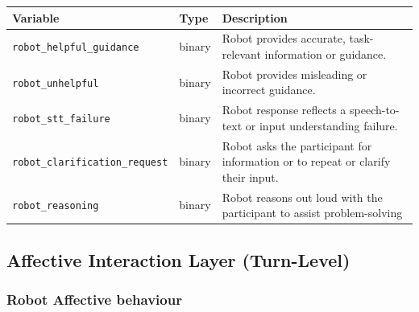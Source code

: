 \documentclass[
  authoryear,
  doubleblind,
  3p]{elsarticle}
\newcounter{none} %
\begin{document}
{\def\LTcaptype{none} %
\begin{longtable}[]{@{}
  >{\raggedright\arraybackslash}p{}
  >{\raggedright\arraybackslash}p{}
  >{\raggedright\arraybackslash}p{}@{}}
\toprule\noalign{}
\begin{minipage}[b]{\linewidth}\raggedright
Variable
\end{minipage} & \begin{minipage}[b]{\linewidth}\raggedright
Type
\end{minipage} & \begin{minipage}[b]{\linewidth}\raggedright
Description
\end{minipage} \\
\midrule\noalign{}
\endhead
\bottomrule\noalign{}
\endlastfoot
\texttt{robot\_helpful\_guidance} & binary & Robot provides accurate,
task-relevant information or guidance. \\
\texttt{robot\_unhelpful} & binary & Robot provides misleading or
incorrect guidance. \\
\texttt{robot\_stt\_failure} & binary & Robot response reflects a
speech-to-text or input understanding failure. \\
\texttt{robot\_clarification\_request} & binary & Robot asks the
participant for information or to repeat or clarify their input. \\
\texttt{robot\_reasoning} & binary & Robot reasons out loud with the
participant to assist problem-solving \\
\end{longtable}
}

\subsection{Affective Interaction Layer
(Turn-Level)}\label{affective-interaction-layer-turn-level}

\subsubsection*{Robot Affective
behaviour}\label{robot-affective-behaviour}
\end{document}
